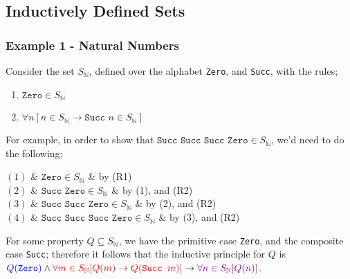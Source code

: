 \documentclass[a4paper, 12pt]{article}
\newcommand{\proofline}[3]{$(#1)$ & $#2$ & \hfill #3 \smallskip \\}
\begin{document}
        \subsection*{Inductively Defined Sets}
            \subsubsection*{Example 1 - Natural Numbers}
                Consider the set $S_\mathbb{N}$, defined over the alphabet \texttt{Zero}, and \texttt{Succ}, with the rules;
                \begin{enumerate}[R1]
                    \itemsep0em
                    \item $\texttt{Zero} \in S_\mathbb{N}$
                    \item $\forall n [n \in S_\mathbb{N} \rightarrow \texttt{Succ } n \in S_\mathbb{N}]$
                \end{enumerate}
                For example, in order to show that $\texttt{Succ Succ Succ Zero} \in S_\mathbb{N}$, we'd need to do the following;
                \begin{reasoning}
                    \proofline{1}{\texttt{Zero} \in S_\mathbb{N}}{by (R1)}
                    \proofline{2}{\texttt{Succ Zero} \in S_\mathbb{N}}{by (1), and (R2)}
                    \proofline{3}{\texttt{Succ Succ Zero} \in S_\mathbb{N}}{by (2), and (R2)}
                    \proofline{4}{\texttt{Succ Succ Succ Zero} \in S_\mathbb{N}}{by (3), and (R2)}
                \end{reasoning}
                For some property $Q \subseteq S_\mathbb{N}$, we have the primitive case \texttt{Zero}, and the composite case \texttt{Succ}; therefore it follows that the inductive principle for $Q$ is $\textcolor{blue}{Q(\texttt{Zero})} \land \textcolor{red}{\forall m \in S_\mathbb{N} [Q(m) \rightarrow Q(\texttt{Succ } m)]} \rightarrow \textcolor{violet}{\forall n \in S_\mathbb{N} [Q(n)]}$.
\end{document}
